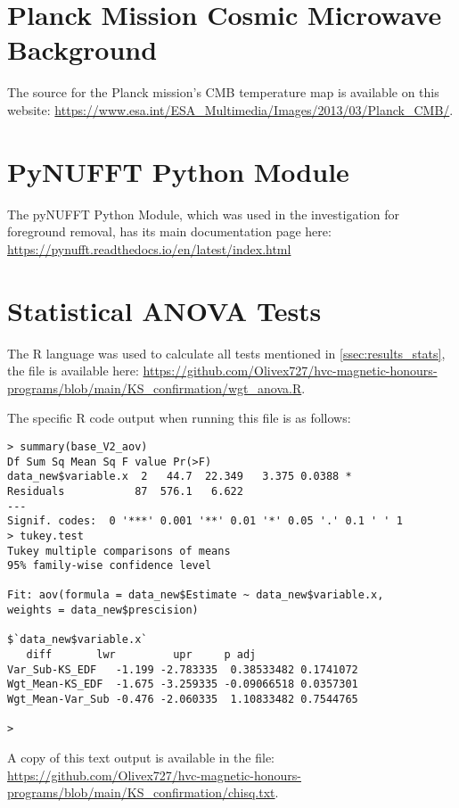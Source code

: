 \section{Planck Mission Cosmic Microwave Background}
\label{sec:appendixC}

The source for the Planck mission's CMB temperature map is available on this website: \url{https://www.esa.int/ESA_Multimedia/Images/2013/03/Planck_CMB/}.

\section{PyNUFFT Python Module}
\label{sec:appendixD}

The pyNUFFT Python Module, which was used in the investigation for foreground removal, has its main documentation page here: \url{https://pynufft.readthedocs.io/en/latest/index.html}

\newpage

\section{Statistical ANOVA Tests}
\label{sec:appendixE}

The R language was used to calculate all tests mentioned in \ref{ssec:results_stats}, the file is available here: \url{https://github.com/Olivex727/hvc-magnetic-honours-programs/blob/main/KS_confirmation/wgt_anova.R}.

The specific R code output when running this file is as follows:

\begin{verbatim}
> summary(base_V2_aov)
Df Sum Sq Mean Sq F value Pr(>F)  
data_new$variable.x  2   44.7  22.349   3.375 0.0388 *
Residuals           87  576.1   6.622                 
---
Signif. codes:  0 '***' 0.001 '**' 0.01 '*' 0.05 '.' 0.1 ' ' 1
> tukey.test
Tukey multiple comparisons of means
95% family-wise confidence level

Fit: aov(formula = data_new$Estimate ~ data_new$variable.x,
weights = data_new$prescision)

$`data_new$variable.x`
   diff       lwr         upr     p adj
Var_Sub-KS_EDF   -1.199 -2.783335  0.38533482 0.1741072
Wgt_Mean-KS_EDF  -1.675 -3.259335 -0.09066518 0.0357301
Wgt_Mean-Var_Sub -0.476 -2.060335  1.10833482 0.7544765

> 
\end{verbatim}

A copy of this text output is available in the file: \url{https://github.com/Olivex727/hvc-magnetic-honours-programs/blob/main/KS_confirmation/chisq.txt}.